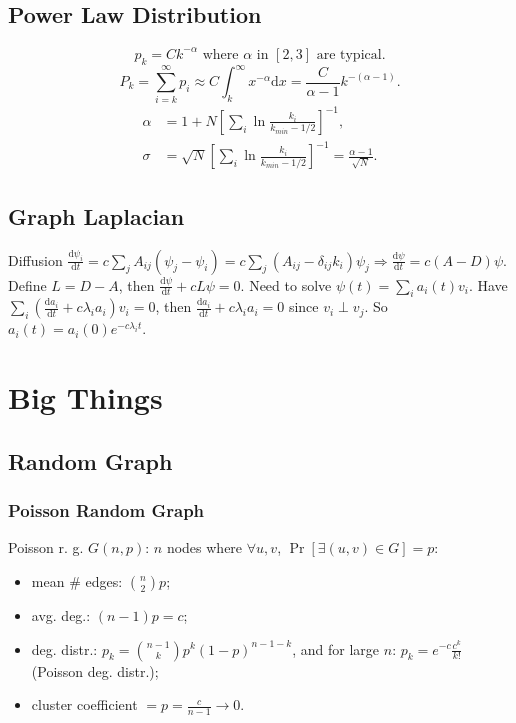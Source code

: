 \documentclass[a4paper,twocolumn,10pt]{article}
\newcommand{\dd}{\mathrm{d}}
\begin{document}
\subsection{Power Law Distribution}
	\[
		p_k = C k^{-\alpha} \textrm{ where $\alpha$ in $[2,3]$ are typical}.
	\]
	\[
		P_k = \sum_{i=k}^\infty p_i
			\approx C \int_k^\infty x^{-\alpha} \dd x
			=\frac{C}{\alpha-1} k^{-(\alpha-1)}.
	\]
	\[ \begin{split}
		\alpha &= 1 + N\left[ \sum_i \ln \frac{k_i}{k_{min} - 1/2} \right]^{-1}, \\
		\sigma &= \sqrt{N} \left[ \sum_i \ln \frac{k_i}{k_{min} - 1/2} \right]^{-1}
			= \frac{\alpha-1}{\sqrt{N}}.
	\end{split} \]

\subsection{Graph Laplacian}
	Diffusion $\frac{\dd \psi_i}{\dd t}=c \sum_j A_{ij} (\psi_j-\psi_i)
		=c\sum_j(A_{ij}-\delta_{ij}k_i)\psi_j
		\Longrightarrow \frac{\dd \psi}{\dd t}=c(A-D)\psi$.
	Define $L=D-A$, then $\frac{\dd \psi}{\dd t}+cL\psi=0$.
	Need to solve $\psi(t)=\sum_i a_i(t) v_i$.
	Have $\sum_i (\frac{\dd a_i}{\dd t} + c\lambda_i a_i) v_i = 0$,
	then $\frac{\dd a_i}{\dd t} + c \lambda_i a_i=0$ since $v_i\perp v_j$.
	So $a_i(t)=a_i(0) e^{-c\lambda_i t}$.

\section{Big Things}

\subsection{Random Graph}
	\subsubsection{Poisson Random Graph}
		Poisson r. g. $G(n,p)$:
		$n$ nodes where $\forall u,v$, $\Pr[\exists (u,v)\in G]=p$:
		\begin{itemize}
			\item mean $\#$ edges: $\binom{n}{2} p$;
			\item avg. deg.: $(n-1)p=c$;
			\item deg. distr.: $p_k=\binom{n-1}{k} p^k (1-p)^{n-1-k}$,
				and for large $n$: $p_k=e^{-c} \frac{c^k}{k!}$ (Poisson deg. distr.);
			\item cluster coefficient $= p = \frac{c}{n-1} \to 0$.
		\end{itemize}
	
\end{document}
